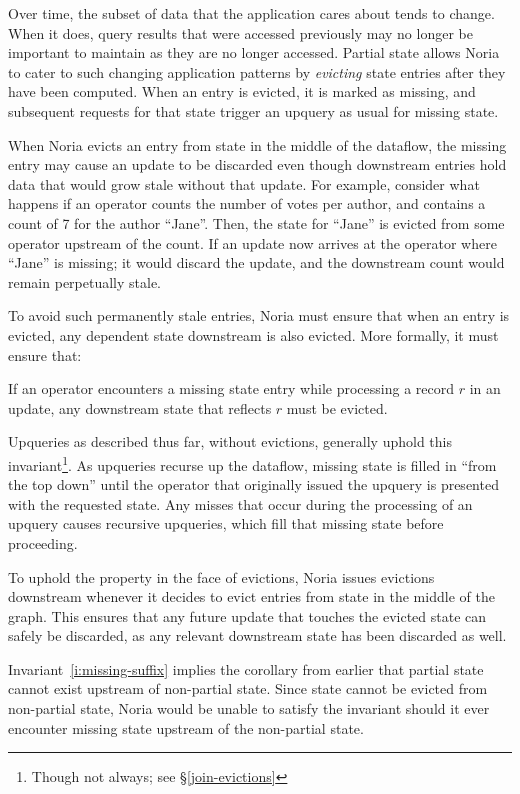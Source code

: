 Over time, the subset of data that the application cares about tends to change.
When it does, query results that were accessed previously may no longer be
important to maintain as they are no longer accessed. Partial state allows Noria
to cater to such changing application patterns by \textit{evicting} state
entries after they have been computed. When an entry is evicted, it is marked as
missing, and subsequent requests for that state trigger an upquery as usual for
missing state.

When Noria evicts an entry from state in the middle of the dataflow, the missing
entry may cause an update to be discarded even though downstream entries hold
data that would grow stale without that update. For example, consider what
happens if an operator counts the number of votes per author, and contains a
count of 7 for the author ``Jane''. Then, the state for ``Jane'' is evicted from
some operator upstream of the count. If an update now arrives at the operator
where ``Jane'' is missing; it would discard the update, and the downstream count
would remain perpetually stale.

To avoid such permanently stale entries, Noria must ensure that when an entry is
evicted, any dependent state downstream is also evicted. More formally, it must
ensure that:

\begin{invariant}
  \label{i:missing-suffix}
  If an operator encounters a missing state entry while processing a record $r$
  in an update, any downstream state that reflects $r$ must be evicted.
\end{invariant}

Upqueries as described thus far, without evictions, generally uphold this
invariant\footnote{Though not always; see \S\ref{join-evictions}}. As upqueries
recurse up the dataflow, missing state is filled in ``from the top down'' until
the operator that originally issued the upquery is presented with the requested
state. Any misses that occur during the processing of an upquery causes
recursive upqueries, which fill that missing state before proceeding.

To uphold the property in the face of evictions, Noria issues evictions
downstream whenever it decides to evict entries from state in the middle of the
graph. This ensures that any future update that touches the evicted state can
safely be discarded, as any relevant downstream state has been discarded as
well.

Invariant~\ref{i:missing-suffix} implies the corollary from earlier that partial
state cannot exist upstream of non-partial state. Since state cannot be evicted
from non-partial state, Noria would be unable to satisfy the invariant should it
ever encounter missing state upstream of the non-partial state.
